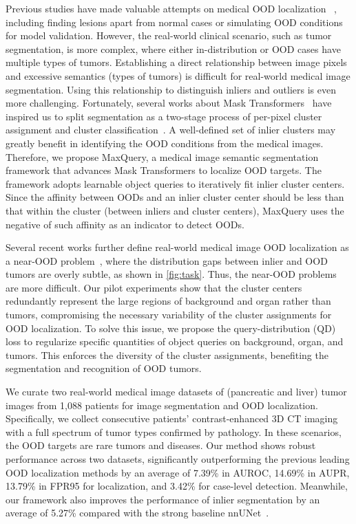 \documentclass[10pt,twocolumn,letterpaper]{article}
\begin{document}
Previous studies have made valuable attempts on medical OOD localization~ \cite{tian2021constrained,zimmerer2022mood}, including finding lesions apart from normal cases or simulating OOD conditions for model validation. However, the real-world clinical scenario, such as tumor segmentation, is more complex, where either in-distribution or OOD cases have multiple types of tumors. Establishing a direct relationship between image pixels and excessive semantics (types of tumors) is difficult for real-world medical image segmentation. Using this relationship to distinguish inliers and outliers is even more challenging. Fortunately, several works about Mask Transformers~\cite{carion2020end,cheng2021per} have inspired us to split segmentation as a two-stage process of per-pixel cluster assignment and cluster classification~\cite{ yu2022cmt,yu2022k}. A well-defined set of inlier clusters may greatly benefit in identifying the OOD conditions from the medical images. Therefore, we propose MaxQuery, a medical image semantic segmentation framework that advances Mask Transformers to localize OOD targets. The framework adopts learnable object queries to iteratively fit inlier cluster centers. Since the affinity between OODs and an inlier cluster center should be less than that within the cluster (between inliers and cluster centers), MaxQuery uses the negative of such affinity as an indicator to detect OODs. 

Several recent works further define real-world medical image OOD localization as a near-OOD problem~\cite{winkens2020contrastive,roy2022does}, where the distribution gaps between inlier and OOD tumors are overly subtle, as shown in \cref{fig:task}. Thus, the near-OOD problems are more difficult. Our pilot experiments show that the cluster centers redundantly represent the large regions of background and organ rather than tumors, compromising the necessary variability of the cluster assignments for OOD localization. To solve this issue, we propose the query-distribution (QD) loss to regularize specific quantities of object queries on background, organ, and tumors. This enforces the diversity of the cluster assignments, benefiting the segmentation and recognition of OOD tumors.

We curate two real-world medical image datasets of (pancreatic and liver) tumor images from 1,088 patients for image segmentation and OOD localization. Specifically, we collect consecutive patients' contrast-enhanced 3D CT imaging with a full spectrum of tumor types confirmed by pathology. In these scenarios, the OOD targets are rare tumors and diseases. Our method shows robust performance across two datasets, significantly outperforming the previous leading OOD localization methods by an average of 7.39\% in AUROC, 14.69\% in AUPR, 13.79\% in FPR95 for localization, and 3.42\% for case-level detection. Meanwhile, our framework also improves the performance of inlier segmentation by an average of 5.27\% compared with the strong baseline nnUNet~\cite{isensee2021nnu}.
\end{document}
